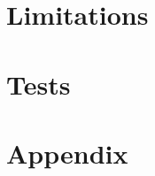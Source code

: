 \documentclass[titlepage, twocolumn, a4paper, 10pt]{article}
\begin{document}




\section{Limitations}\label{sec:limitations}


\section{Tests}\label{sec:tests}






\newpage
\appendix
{}
\section{Appendix}\label{sec:kallkod}
\end{document}
